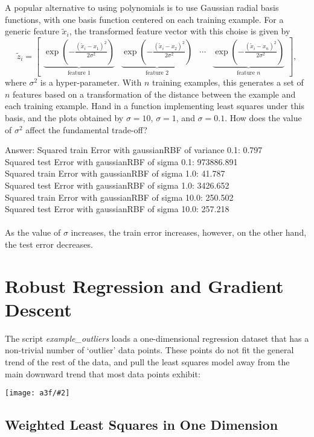 \documentclass{article}
\def\ans#1{\par\gre{Answer: #1}}
\def\blu#1{{\color{blu}#1}}
\def\gre#1{{\color{gre}#1}}
\newcommand{\mat}[1]{\begin{bmatrix}#1\end{bmatrix}}
\newcommand{\centerfig}[2]{\begin{center}\texttt{[image: a3f/\#2]}\end{center}}
\begin{document}
A popular alternative to using polynomials is to use Gaussian radial basis functions, with one basis function centered on each training example. For a generic feature $\tilde{x}_i$, the transformed feature vector with this choise is given by
\[
\tilde{z}_i = \mat{\underbrace{\exp\left(-\frac{(\tilde{x}_i - x_1)^2}{2\sigma^2}\right)}_\text{feature 1} & \underbrace{\exp\left(-\frac{(\tilde{x}_i - x_2)^2}{2\sigma^2}\right)}_\text{feature 2} & \cdots & \underbrace{\exp\left(-\frac{(\tilde{x}_i - x_n)^2}{2\sigma^2}\right)}_\text{feature $n$}},
\]
where $\sigma^2$ is a hyper-parameter. With $n$ training examples, this generates a set of $n$ features based on a transformation of the distance between the example and each training example. \blu{Hand in a function implementing least squares under this basis, and the plots obtained by $\sigma=10$, $\sigma=1$, and $\sigma=0.1$. How does the value of $\sigma^2$ affect the fundamental trade-off?}
\ans{Squared train Error with gaussianRBF of variance 0.1: 0.797 \\
Squared test Error with gaussianRBF of sigma 0.1: 973886.891 \\
Squared train Error with gaussianRBF of sigma 1.0: 41.787 \\
Squared test Error with gaussianRBF of sigma 1.0: 3426.652 \\ 
Squared train Error with gaussianRBF of sigma 10.0: 250.502 \\
Squared test Error with gaussianRBF of sigma 10.0: 257.218 \\
\\
As the value of $\sigma$ increases, the train error increases, however, on the other hand, the test error decreases.}


\pagebreak

\section{Robust Regression and Gradient Descent}

The script \emph{example\_outliers} loads a one-dimensional regression dataset that has a non-trivial number of `outlier' data points. These points do not fit the general trend of the rest of the data, and pull the least squares model away from the main downward trend that most data points exhibit:
\centerfig{.7}{outliers}



\pagebreak

\subsection{Weighted Least Squares in One Dimension}
\end{document}
